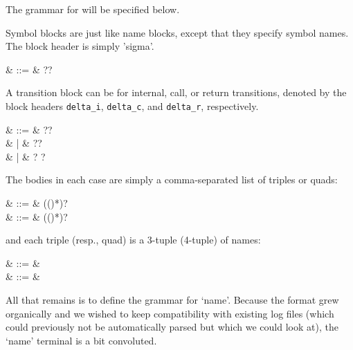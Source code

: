 The grammar for  will be specified below.


Symbol blocks are just like name blocks, except that they specify symbol
names. The block header is simply 'sigma'.

\begin{grammar}
   & ::= & \cfgsp  \term{\{}?\cfgsp  {}\cfgsp  \term{\}}?
\end{grammar}

A transition block can be for internal, call, or return transitions,
denoted by the block headers \texttt{delta\_i}, \texttt{delta\_c}, and
\texttt{delta\_r}, respectively.
 
\begin{grammar}
   & ::= & \cfgsp  \term{\{}?\cfgsp  {}\cfgsp  \term{\}}? \\
                        &   | & \cfgsp  \term{\{}?\cfgsp  {}\cfgsp  \term{\}}? \\
                        &   | & \cfgsp  \term{\{}?\cfgsp  {}  \cfgsp  \term{\}}?
\end{grammar}

The bodies in each case are simply a comma-separated list of triples
or quads:

\begin{grammar}
   & ::= & (\cfgsp  (\term{,}\cfgsp  {})*)? \\
     & ::= & (\cfgsp  (\term{,}\cfgsp  {})*)?
\end{grammar}

and each triple (resp., quad) is a 3-tuple (4-tuple) of names:

\begin{grammar}
   & ::= &  \term{(}\cfgsp  {}\cfgsp \term{,}\cfgsp  {}\cfgsp  \term{,}\cfgsp  {}\cfgsp  \term{)} \\
   & ::= &  \term{(}\cfgsp  {}\cfgsp \term{,}\cfgsp  {}\cfgsp  \term{,}\cfgsp  {}\cfgsp  \term{,}\cfgsp  {}\cfgsp  \term{)}
\end{grammar}


All that remains is to define the grammar for `name'. Because the
format grew organically and we wished to keep compatibility with
existing log files (which could previously not be automatically parsed
but which we could look at), the `name' terminal is a bit convoluted.


